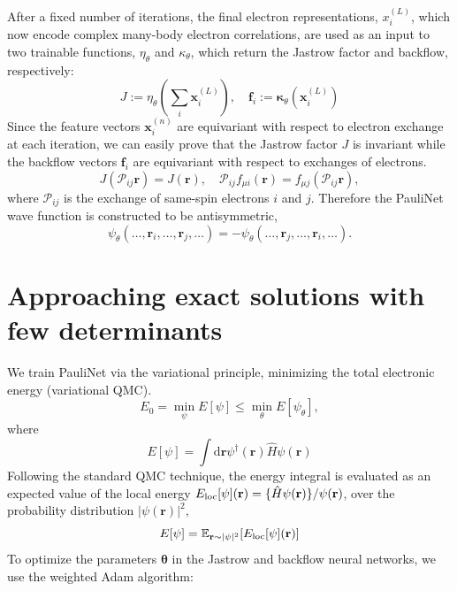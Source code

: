 \documentclass[12pt]{article}
\begin{document}
After a fixed number of iterations, the final electron representations, $x_i^{(L)}$, 
which now encode complex many-body electron correlations, are used as an input to 
two trainable functions, $\eta_\theta$ and $\kappa_\theta$, which return the 
Jastrow factor and backflow, respectively:
\begin{equation}
    J:=\eta_{\theta}\left(\sum_{i} \mathbf{x}_{i}^{(L)}\right), \quad 
    \mathbf{f}_{i}:=\boldsymbol{\kappa}_{\theta}\left(\mathbf{x}_{i}^{(L)}\right)
\end{equation}
Since the feature vectors $\mathbf{x}_i^{(n)}$ are equivariant with respect to electron 
exchange at each iteration, we can easily prove that the Jastrow factor $J$ is 
invariant while the backflow vectors $\mathbf{f}_i$ are equivariant with respect 
to exchanges of electrons.
\begin{equation}
    J\left(\mathcal{P}_{ij}\mathbf{r}\right)=J(\mathbf{r}),\quad\mathcal{P}_{ij}
    f_{\mu i}(\mathbf{r})=f_{\mu j}\left(\mathcal{P}_{ij}\mathbf{r}\right),
\end{equation}
where $\mathcal{P}_{ij}$ is the exchange of same-spin electrons $i$ and $j$. 
Therefore the PauliNet wave function is constructed to be antisymmetric,
\begin{equation}
    \psi_\theta\left(\ldots, \mathbf{r}_{i}, \ldots, \mathbf{r}_{j}, \ldots\right)=
    -\psi_\theta\left(\ldots, \mathbf{r}_{j}, \ldots, \mathbf{r}_{i}, \ldots\right).
\end{equation}
\section{\large Approaching exact solutions with few determinants}
We train PauliNet via the variational principle, minimizing the total electronic 
energy (variational QMC).
\begin{equation}
    E_{0}=\min _{\psi} E[\psi] \leq \min _{\theta} E\left[\psi_{\theta}\right],
\end{equation}
where 
\begin{equation}
    E[\psi]=\int \mathrm{d} \mathbf{r} \psi^{\dagger}(\mathbf{r}) \hat{H} \psi(\mathbf{r})
\end{equation}
Following the standard QMC technique, the energy integral is evaluated as an 
expected value of the local energy 
$E_{\rm loc}[\psi](\mathbf{r})=\{\hat{H}\psi(\mathbf{r})\}/\psi(\mathbf{r})$, over the 
probability distribution $|\psi(\mathbf{r})|^2$,
\begin{equation}
    E[\psi]=\mathbb{E}_{\mathbf{r}\sim|\psi|^2}[E_{\rm loc}[\psi](\mathbf{r})]
\end{equation}
To optimize the parameters $\boldsymbol{\theta}$ in the Jastrow and backflow neural networks, we 
use the weighted Adam algorithm:
\end{document}
